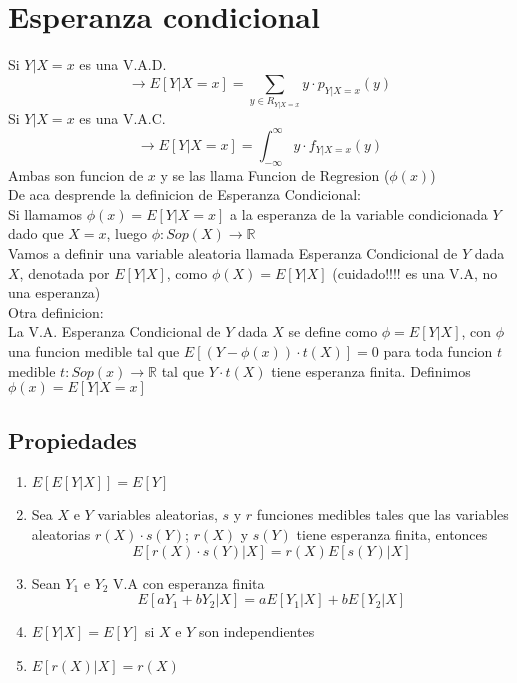 \documentclass[titlepage,a4paper]{article}
\begin{document}
\section{Esperanza condicional}
Si $Y|X=x$ es una V.A.D.
\begin{equation*}
    \rightarrow E[Y|X=x] = \sum_{y \in R_{Y|X=x}}y \cdot p_{Y|X=x}(y)
\end{equation*}
Si $Y|X=x$ es una V.A.C.
\begin{equation*}
    \rightarrow E[Y|X=x] = \int_{-\infty}^{\infty} y \cdot f_{Y|X=x}(y)
\end{equation*}
 Ambas son funcion de $x$ y se las llama \color{orange} Funcion de Regresion ($\phi (x)$)\color{black}\\
 De aca desprende la definicion de Esperanza Condicional:\\
 Si llamamos $\phi (x) = E[Y|X=x]$ a la esperanza de la variable condicionada $Y$ dado que $X = x$, luego 
 $\phi: Sop(X)\rightarrow \mathbb{R}$ \\
 Vamos a definir una variable aleatoria llamada \color{purple} Esperanza Condicional \color{black} de $Y$ dada $X$, denotada por $E[Y|X]$,
 como $\phi (X)= E[Y|X]$ (cuidado!!!! es una V.A, no una esperanza)\\
 Otra definicion:\\
 La V.A. Esperanza Condicional de $Y$ dada $X$ se define como $\phi = E[Y|X]$, con $\phi$ una funcion medible tal que 
 $E[(Y-\phi(x))\cdot t(X)] = 0$ para toda funcion $t$ medible $t:Sop(x)\rightarrow \mathbb{R}$ tal 
 que $Y \cdot t(X)$ tiene esperanza finita.
 Definimos $\phi(x) = E[Y|X=x]$
 \subsection{Propiedades}
 \begin{enumerate}
     \item $E[E[Y|X]] = E[Y]$
     \item Sea $X$ e $Y$ variables aleatorias, $s$ y $r$ funciones medibles tales que las variables aleatorias $r(X) \cdot s(Y)$; $r(X)$ y $s(Y)$ tiene esperanza finita, entonces 
     \begin{equation*}
         E[r(X) \cdot s(Y)|X] = r(X) E [s(Y)|X]
     \end{equation*}
     \item Sean $Y_{1}$ e $Y_{2}$ V.A con esperanza finita
     \begin{equation*}
         E[aY_{1}+bY_{2}|X] = aE[Y_{1}|X] + bE[Y_{2}|X]
     \end{equation*}
     \item $E[Y|X] = E[Y]$ si $X$ e $Y$ son independientes
     \item $E[r(X)|X] = r(X)$
 \end{enumerate} 
\end{document}
